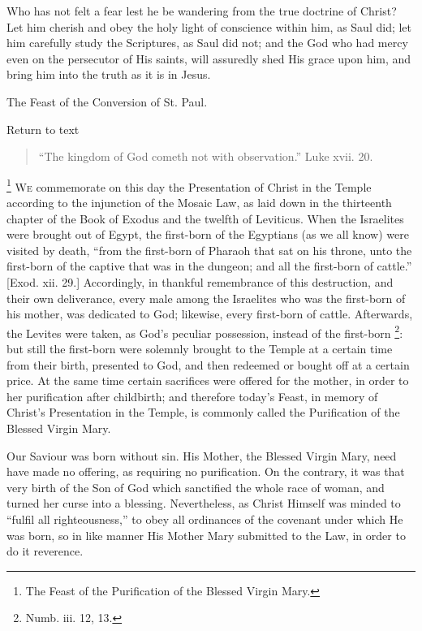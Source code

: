 Who has not felt a fear lest he be wandering from the true doctrine
of Christ? Let him cherish and obey the holy light of conscience
within him, as Saul did; let him carefully study the Scriptures, as
Saul did not; and the God who had mercy even on the persecutor of His
saints, will assuredly shed His grace upon him, and bring him into the
truth as it is in Jesus.


The Feast of the Conversion of St. Paul.

Return to text


\begin{quote}

``The kingdom of God cometh not with observation.'' Luke
xvii. 20.

\end{quote}

\footnote{The Feast of the Purification of the Blessed Virgin Mary.} W\textsc{e} commemorate on this
day the Presentation of Christ in the Temple according to the injunction
of the Mosaic Law, as laid down in the thirteenth chapter of the Book of
Exodus and the twelfth of Leviticus. When the Israelites were brought
out of Egypt, the first-born of the Egyptians (as we all know) were
visited by death, ``from the first-born of Pharaoh that sat on his
throne, unto the first-born of the captive that was in the dungeon; and
all the first-born of cattle.'' [Exod. xii. 29.] Accordingly, in
thankful remembrance of this destruction, and their own deliverance,
every male among the Israelites who was the first-born of his mother,
was dedicated to God; likewise, every first-born of cattle. Afterwards,
the Levites were taken, as God's peculiar possession, instead of the
first-born \footnote{Numb. iii. 12, 13.}: but still the
first-born were solemnly brought to the Temple at a certain time from
their birth, presented to God, and then redeemed or bought off at a
certain price. At the same time certain sacrifices were offered for the
mother, in order to her purification after childbirth; and therefore
today's Feast, in memory of Christ's Presentation in the Temple, is
commonly called the Purification of the Blessed Virgin Mary.

Our Saviour was born without sin. His Mother, the Blessed Virgin
Mary, need have made no offering, as requiring no purification. On the
contrary, it was that very birth of the Son of God which sanctified the
whole race of woman, and turned her curse into a blessing. Nevertheless,
as Christ Himself was minded to ``fulfil all righteousness,'' to
obey all ordinances of the covenant under which He was born, so in like
manner His Mother Mary submitted to the Law, in order to do it
reverence.

